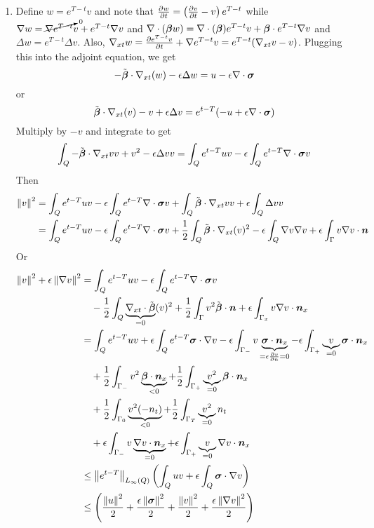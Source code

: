 \documentclass{article}
\begin{document}
\begin{enumerate}
\item Define $w=e^{T-t}v$ and note that $\frac{\partial w}{\partial t}=\left( \frac{\partial v}{\partial t}-v \right)e^{T-t}$ while $\nabla w=\cancelto{0}{\nabla e^{T-t}} v+e^{T-t}\nabla v$ and
$\nabla\cdot(\boldsymbol\beta w)=\nabla\cdot(\boldsymbol\beta)e^{T-t} v+\boldsymbol\beta\cdot e^{T-t}\nabla v$ and $\Delta w=e^{T-t}\Delta v$. 
Also, $\nabla_{xt} w=\frac{\partial e^{T-t} v}{\partial t}+\nabla{e^{T-t} v}=e^{T-t}(\nabla_{xt} v-v)$.
Plugging this into the adjoint equation, we get
\begin{equation*}
-\tilde{\boldsymbol\beta}\cdot\nabla_{xt}(w)-\epsilon\Delta w=u-\epsilon\nabla\cdot\boldsymbol\sigma
\end{equation*}
or 
\begin{equation*}
\tilde{\boldsymbol\beta}\cdot\nabla_{xt}(v)-v+\epsilon\Delta v=e^{t-T}(-u+\epsilon\nabla\cdot\boldsymbol\sigma)
\end{equation*}
Multiply by $-v$ and integrate to get
\begin{align*}
\int_Q-\tilde{\boldsymbol\beta}\cdot\nabla_{xt} vv+v^2-\epsilon\Delta vv=\int_Qe^{t-T}uv-\epsilon\int_Qe^{t-T}\nabla\cdot\boldsymbol\sigma v
\end{align*}
Then
\begin{align*}
\norm{v}^2&=\int_Qe^{t-T}uv
-\epsilon\int_Qe^{t-T}\Div\bfsigma v
+\int_Q\tilde\bfbeta\cdot\Gradxt vv
+\epsilon\int_Q\Delta vv\\
%
&=\int_Qe^{t-T}uv
-\epsilon\int_Qe^{t-T}\Div\bfsigma v
+\frac{1}{2}\int_Q\tilde\bfbeta\cdot\Gradxt(v)^2
-\epsilon\int_Q\Grad v\Grad v
+\epsilon\int_\Gamma v\Grad v\cdot\bfn
\\
\end{align*}
Or
\begin{align*}
\left\| v \right\|^2+\epsilon\left\| \nabla v \right\|^2&=\int_Qe^{t-T}uv
-\epsilon\int_Qe^{t-T}\nabla\cdot\boldsymbol\sigma v\\
&\quad-\frac{1}{2}\int_Q\underbrace{\nabla_{xt}\cdot\tilde{\boldsymbol\beta}}_{=0}(v)^2
+\frac{1}{2}\int_\Gamma v^2\tilde{\boldsymbol\beta}\cdot\boldsymbol n
+\epsilon\int_{\Gamma_x} v\nabla v\cdot\boldsymbol n_x
\\
&=\int_Qe^{t-T}uv
+\epsilon\int_Qe^{t-T}\boldsymbol\sigma\cdot\nabla v
-\epsilon\int_{\Gamma_-}v\underbrace{\boldsymbol\sigma\cdot\boldsymbol n_x}_{=\epsilon\frac{\partial v}{\partial n}=0}
-\epsilon\int_{\Gamma_+}\underbrace{v}_{=0}\boldsymbol\sigma\cdot\boldsymbol n_x\\
&\quad+\frac{1}{2}\int_{\Gamma_-} v^2\underbrace{\boldsymbol\beta\cdot\boldsymbol n_x}_{<0}
+\frac{1}{2}\int_{\Gamma_+} \underbrace{v^2}_{=0}\boldsymbol\beta\cdot\boldsymbol n_x\\
&\quad+\frac{1}{2}\int_{\Gamma_0} \underbrace{v^2 (-n_t)}_{<0}
+\frac{1}{2}\int_{\Gamma_T} \underbrace{v^2}_{=0} n_t\\
&\quad+\epsilon\int_{\Gamma_-} v\underbrace{\nabla v\cdot\boldsymbol n_x}_{=0}
+\epsilon\int_{\Gamma_+} \underbrace{v}_{=0}\nabla v\cdot\boldsymbol n_x
\\
&\leq \left\| e^{t-T} \right\|_{L_\infty(Q)}\left( \int_Quv+\epsilon\int_Q\boldsymbol\sigma\cdot\nabla v \right)
\\
&\leq \left( \frac{\left\| u \right\|^2}{2}+\frac{\epsilon\left\| \boldsymbol\sigma \right\|^2}{2}+\frac{\left\| v \right\|^2}{2}+\frac{\epsilon\left\| \nabla v \right\|^2}{2} \right)
\\
\end{align*}


\end{enumerate}
\end{document}
